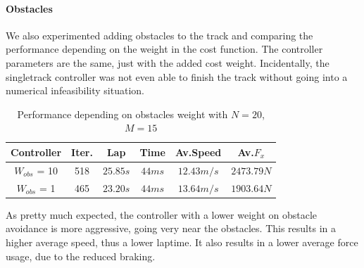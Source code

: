 \documentclass[a4paper, onecolumn, 12pt]{article}
\begin{document}
\paragraph*{Obstacles}
We also experimented adding obstacles to the track and comparing the performance
depending on the weight in the cost function. The controller parameters are the
same, just with the added cost weight. Incidentally, the singletrack controller
was not even able to finish the track without going into a numerical
infeasibility situation. 
\begin{table}[H] 
    \centering
    \caption{Performance depending on obstacles weight with $N=20$, $M=15$} \label{obstacles_ippodromo}
    \begin{tabular}{|c||c|c|c|c|c|}
        \hline
        \textbf{Controller} & \textbf{Iter.} & \textbf{Lap} & \textbf{Time} & \textbf{Av.Speed} & \textbf{Av.$F_x$} \\ [0.5ex] 
        \hline
        \hline
        $W_{obs}$ = 10 & 518 & $25.85 s$ & $44 ms$ & $12.43 m/s$ & $2473.79 N$\\
        \hline
        $W_{obs}$ = 1 & 465 & $23.20 s$ & $44 ms$ & $13.64 m/s$ & $1903.64 N$\\
        \hline
    \end{tabular}
\end{table}
As pretty much expected, the controller with a lower weight on obstacle
avoidance is more aggressive, going very near the obstacles. This results in a
higher average speed, thus a lower laptime. It also results in a lower average
force usage, due to the reduced braking. 
\end{document}
